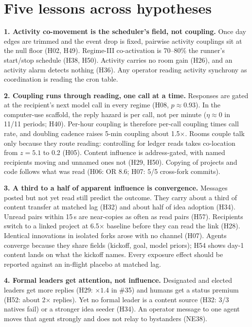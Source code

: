 \documentclass[aps,pre,reprint,10pt,nofootinbib]{revtex4-2}
\begin{document}
\section{Five lessons across hypotheses}
\textbf{1. Activity co-movement is the scheduler's field, not coupling.} Once day edges are trimmed and the event drop is fixed, pairwise activity couplings sit at the null floor (H02, H49). Regime-III co-activation is 70--80\% the runner's start/stop schedule (H38, H50). Activity carries no room gain (H26), and an activity alarm detects nothing (H36). Any operator reading activity synchrony as coordination is reading the cron table.

\textbf{2. Coupling runs through reading, one call at a time.} Responses are gated at the recipient's next model call in every regime (H08, $p\approx0.93$). In the computer-use scaffold, the reply hazard is per call, not per minute ($\eta\approx0$ in 11/11 periods; H40). Per-hour coupling is therefore per-call coupling times call rate, and doubling cadence raises 5-min coupling about 1.5$\times$. Rooms couple talk only because they route reading: controlling for ledger reads takes co-location from $z=5.1$ to 0.2 (H05). Content influence is address-gated, with named recipients moving and unnamed ones not (H29, H50). Copying of projects and code follows what was read (H06: OR 8.6; H07: 5/5 cross-fork commits).

\textbf{3. A third to a half of apparent influence is convergence.} Messages posted but not yet read still predict the outcome. They carry about a third of content transfer at matched lag (H32) and about half of idea adoption (H34). Unread pairs within 15\,s are near-copies as often as read pairs (H57). Recipients switch to a linked project at 6.5$\times$ baseline before they can read the link (H28). Identical innovations in isolated forks arose with no channel (H07). Agents converge because they share fields (kickoff, goal, model priors); H54 shows day-1 content lands on what the kickoff names. Every exposure effect should be reported against an in-flight placebo at matched lag.

\textbf{4. Formal leaders get attention, not influence.} Designated and elected leaders get more replies (H29: $\times1.4$ in \#35) and humans get a status premium (H52: about 2$\times$ replies). Yet no formal leader is a content source (H32: 3/3 natives fail) or a stronger idea seeder (H34). An operator message to one agent moves that agent strongly and does not relay to bystanders (NE38).
\end{document}
